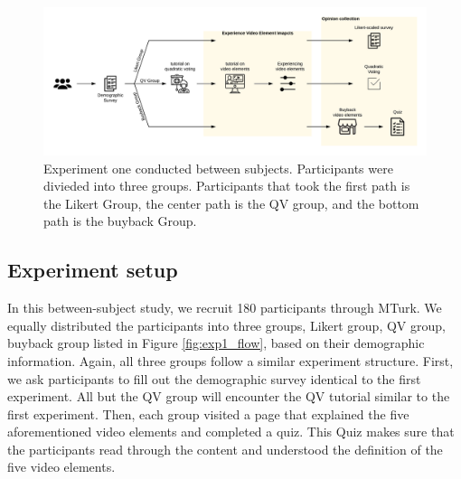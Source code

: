
\begin{figure}[htpb]
    \centering
    \includegraphics[width=\textwidth, keepaspectratio=true]{content/image/exp2_flow.png}
    \caption{
        Experiment one conducted between subjects. Participants were divieded into three groups. Participants that took the first path is the Likert Group, the center path is the QV group, and the bottom path is the buyback Group.
    }
    \label{fig:exp2_flow}
\end{figure}

\subsection{Experiment setup}
In this between-subject study, we recruit 180 participants through MTurk.
We equally distributed the participants into three groups, Likert group, QV group, buyback group listed in Figure \ref{fig:exp1_flow}, based on their demographic information.
Again, all three groups follow a similar experiment structure.
First, we ask participants to fill out the demographic survey identical to the first experiment.
All but the QV group will encounter the QV tutorial similar to the first experiment.
Then, each group visited a page that explained the five aforementioned video elements and completed a quiz.
This Quiz makes sure that the participants read through the content and understood the definition of the five video elements.


